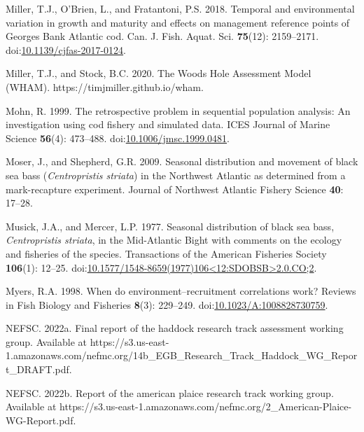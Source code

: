 \documentclass[
]{article}
\newlength{\cslhangindent}
\newlength{\cslentryspacingunit} %
\newenvironment{CSLReferences}[2] %
 {%
  \setlength{\parindent}{0pt}
  \ifodd #1
  \let\oldpar\par
  \def\par{\hangindent=\cslhangindent\oldpar}
  \fi
  \setlength{\parskip}{#2\cslentryspacingunit}
 }%
 {}
\begin{document}
\begin{CSLReferences}{1}{0}
\leavevmode{}%
Miller, T.J., O'Brien, L., and Fratantoni, P.S. 2018. Temporal and
environmental variation in growth and maturity and effects on management
reference points of {Georges Bank Atlantic} cod. Can. J. Fish. Aquat.
Sci. \textbf{75}(12): 2159--2171.
doi:\href{https://doi.org/10.1139/cjfas-2017-0124}{10.1139/cjfas-2017-0124}.

\leavevmode{}%
Miller, T.J., and Stock, B.C. 2020. The {Woods Hole Assessment Model}
({WHAM}). https://timjmiller.github.io/wham.

\leavevmode{}%
Mohn, R. 1999. The retrospective problem in sequential population
analysis: An investigation using cod fishery and simulated data. ICES
Journal of Marine Science \textbf{56}(4): 473--488.
doi:\href{https://doi.org/10.1006/jmsc.1999.0481}{10.1006/jmsc.1999.0481}.

\leavevmode{}%
Moser, J., and Shepherd, G.R. 2009. Seasonal distribution and movement
of black sea bass (\emph{{C}entropristis striata}) in the {N}orthwest
{A}tlantic as determined from a mark-recapture experiment. Journal of
Northwest Atlantic Fishery Science \textbf{40}: 17--28.

\leavevmode{}%
Musick, J.A., and Mercer, L.P. 1977. Seasonal distribution of black sea
bass, \emph{{C}entropristis striata}, in the {M}id-{A}tlantic {B}ight
with comments on the ecology and fisheries of the species. Transactions
of the American Fisheries Society \textbf{106}(1): 12--25.
doi:\href{https://doi.org/10.1577/1548-8659(1977)106\%3C12:SDOBSB\%3E2.0.CO;2}{10.1577/1548-8659(1977)106\textless12:SDOBSB\textgreater2.0.CO;2}.

\leavevmode{}%
Myers, R.A. 1998. When do environment--recruitment correlations work?
Reviews in Fish Biology and Fisheries \textbf{8}(3): 229--249.
doi:\href{https://doi.org/10.1023/A:1008828730759}{10.1023/A:1008828730759}.

\leavevmode{}%
NEFSC. 2022a. Final report of the haddock research track assessment
working group. {Available} at
https://s3.us-east-1.amazonaws.com/nefmc.org/14b\_EGB\_Research\_Track\_Haddock\_WG\_Report\_DRAFT.pdf.

\leavevmode{}%
NEFSC. 2022b. Report of the american plaice research track working
group. {Available} at
https://s3.us-east-1.amazonaws.com/nefmc.org/2\_American-Plaice-WG-Report.pdf.


\end{CSLReferences}
\end{document}
